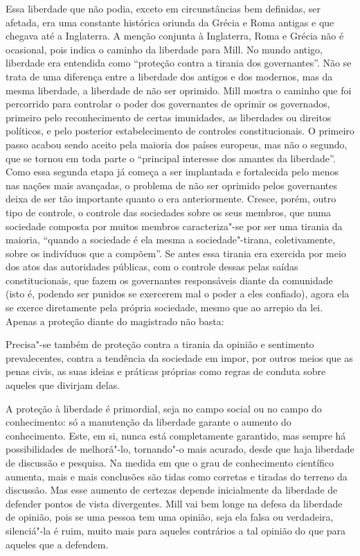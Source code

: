 Essa liberdade que não podia, exceto em circunstâncias bem definidas,
ser afetada, era uma constante histórica oriunda da Grécia e Roma
antigas e que chegava até a Inglaterra. A menção conjunta à Inglaterra,
Roma e Grécia não é ocasional, pois indica o caminho da liberdade para
Mill. No mundo antigo, liberdade era entendida como ``proteção
contra a tirania dos governantes''. Não se trata de uma diferença entre
a liberdade dos antigos e dos modernos, mas da mesma liberdade, a
liberdade de não ser oprimido. Mill mostra o caminho que foi percorrido
para controlar o poder dos governantes de oprimir os governados,
primeiro pelo reconhecimento de certas imunidades, as liberdades ou
direitos políticos, e pelo posterior estabelecimento de controles
constitucionais. O primeiro passo acabou sendo aceito pela maioria dos
países europeus, mas não o segundo, que se tornou em toda parte o
``principal interesse dos amantes da liberdade''. Como
essa segunda etapa já começa a ser implantada e fortalecida pelo menos
nas nações mais avançadas, o problema de não ser oprimido pelos
governantes deixa de ser tão importante quanto o era anteriormente.
Cresce, porém, outro tipo de controle, o controle das sociedades sobre
os seus membros, que numa sociedade composta por muitos membros
caracteriza"-se por ser uma tirania da maioria, ``quando a
sociedade é ela mesma a sociedade"-tirana, coletivamente, sobre os
indivíduos que a compõem''. Se antes essa tirania era exercida por meio
dos atos das autoridades públicas, com o controle dessas pelas saídas
constitucionais, que fazem os governantes responsáveis diante da
comunidade (isto é, podendo ser punidos se exercerem mal o poder a eles
confiado), agora ela se exerce diretamente pela própria sociedade,
mesmo que ao arrepio da lei. Apenas a proteção diante do magistrado não
basta: 

\begin{hedraquote}
Precisa"-se também de proteção contra a tirania da
opinião e sentimento prevalecentes, contra a tendência da sociedade em
impor, por outros meios que as penas civis, as suas ideias e práticas
próprias como regras de conduta sobre aqueles que divirjam delas.
\end{hedraquote}

A proteção à liberdade é primordial, seja no campo social ou no campo do
conhecimento: só a manutenção da liberdade garante o aumento do
conhecimento. Este, em si, nunca está completamente garantido, mas
sempre há possibilidades de melhorá"-lo, tornando"-o mais acurado,
desde que haja liberdade de discussão e pesquisa. Na medida em que o
grau de conhecimento científico aumenta, mais e mais conclusões são
tidas como corretas e tiradas do terreno da discussão. Mas esse aumento
de certezas depende inicialmente da liberdade de defender pontos de
vista divergentes. Mill vai bem longe na defesa da liberdade de
opinião, pois se uma pessoa tem uma opinião, seja ela falsa ou
verdadeira, silenciá"-la é ruim, muito mais para aqueles contrários a
tal opinião do que para aqueles que a defendem.

